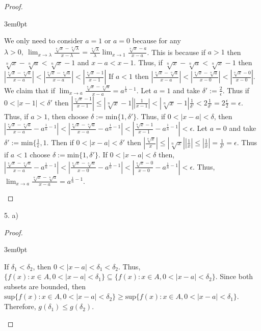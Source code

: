 \documentclass[11pt]{article}
\newenvironment{myproof}
{\begin{proof} \begin{adjustwidth}{3em}{0pt}$ $\par\nobreak\ignorespaces}
{\end{adjustwidth} \end{proof}}
\begin{document}
\begin{flushleft}
\begin{myproof}
We only need to consider $a = 1$ or $a= 0$ because for any $\lambda > 0, \ \lim_{x \to \lambda} \frac{\sqrt[n]{ x} - \sqrt[n]{\lambda}}{ x- \lambda}= \frac{\sqrt[n]{\lambda}}{\lambda} \lim_{x \to 1} \frac{\sqrt[n]{x}-a}{x-a}$. This is because if $a > 1$ then $\sqrt[n]{x} - \sqrt[n]{a} < \sqrt[n]{x} -1$ and $x-a < x- 1$. Thus, if $\sqrt[n]{x} - \sqrt[n]{a} < \sqrt[n]{x} -1$ then $|\frac{\sqrt[n]{x}-\sqrt[n]{a}}{x-a}|<|\frac{\sqrt[n]{x} - \sqrt[n]{a}}{x-a} |<| \frac{\sqrt[n]{x}-1}{x-1}|$ If $a < 1$ then $|\frac{\sqrt[n]{x}-\sqrt[n]{a}}{x-a}|<|\frac{\sqrt[n]{x} - \sqrt[n]{a}}{x-0} |<| \frac{\sqrt[n]{x}-0}{x-0}|$. We claim that if $\lim_{x \to a} \frac{\sqrt[n]{x} - \sqrt[n]{a}}{ x- a} = a^{\frac{1}{n}-1}$. Let $a = 1$ and take $\delta' := \frac{2}{\epsilon}$. Thus if $0<|x-1|< \delta'$ then $|\frac{\sqrt[n]{x}-1}{x-1}|\leq|\sqrt[n]{x} - 1||\frac{1}{x-1}| < |\sqrt[n]{x} - 1|\frac{1}{\delta'} <  2 \frac{1}{\delta'}= 2\frac{\epsilon}{2} = \epsilon$. Thus, if $a > 1$, then choose $\delta := \text{min} \{ 1, \delta' \}$. Thus, if $0<|x-a|< \delta$, then $|\frac{\sqrt[n]{x}-\sqrt[n]{a}}{x-a} - a^{\frac{1}{n}-1}|<|\frac{\sqrt[n]{x} - \sqrt[n]{a}}{x-a} - a^{\frac{1}{n}-1}|<| \frac{\sqrt[n]{x}-1}{x-1} - a^{\frac{1}{n}-1}| < \epsilon$. Let $a = 0$ and take $\delta' :=  \text{min} \{ \frac{1}{\epsilon}, 1$. Then if $0<|x-a|< \delta'$ then $|\frac{\sqrt[n]{x}}{x}| \leq |\sqrt[n]{x} | |\frac{1}{x}| \leq |\frac{1}{x}| = \frac{1}{\delta'} = \epsilon$. Thus if $a < 1$ choose $\delta := \text{min} \{ 1, \delta' \}$. If $0<|x-a|< \delta$ then, $|\frac{\sqrt[n]{x}-\sqrt[n]{a}}{x-a} - a^{\frac{1}{n}-1}|<|\frac{\sqrt[n]{x} - \sqrt[n]{a}}{x-0} - a^{\frac{1}{n}-1}|<| \frac{\sqrt[n]{x}-0}{x-0} - a^{\frac{1}{n}-1}| < \epsilon$. Thus, $\lim_{x \to a} \frac{\sqrt[n]{x} - \sqrt[n]{a}}{ x- a} = a^{\frac{1}{n}-1}$.
\end{myproof}

\newpage

5. a)                                                                                                                                   

\begin{myproof}

If $\delta_1 < \delta_2$, then $0 < |x-a| < \delta_1 < \delta_2$. Thus, $\{ f(x) : x \in A, 0 < |x-a| < \delta_1 \} \subseteq \{ f(x):  x \in A, 0 < |x-a| < \delta_2 \}$. Since both subsets are bounded, then  $\text{sup} \{ f(x):  x \in A, 0 < |x-a| < \delta_2 \} \geq \text{sup} \{ f(x) : x \in A, 0 < |x-a| < \delta_1 \}$. Therefore, $g(\delta_1) \leq g(\delta_2)$.


\end{myproof}
\end{flushleft}
\end{document}

